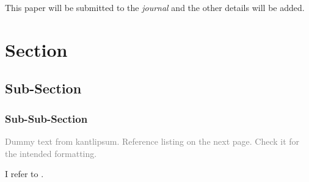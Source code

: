 {This paper will be submitted to the \emph{journal} and the other details will be added.}

\checkBeginRefsection%

\kant[20-21]

\section{Section}
\subsection{Sub-Section}
\subsubsection{Sub-Sub-Section}

\textcolor{gray}{Dummy text from kantlipsum. Reference listing on the next page. Check it for the intended formatting.} 

I refer to \citep{butin2009education, rudestam2014surviving, Goossens2008g,cassuto2010advising,pires2021teens}. 

\kant[9]


\kant[10]

\kant[2-6]

\checkEndRefsection%
